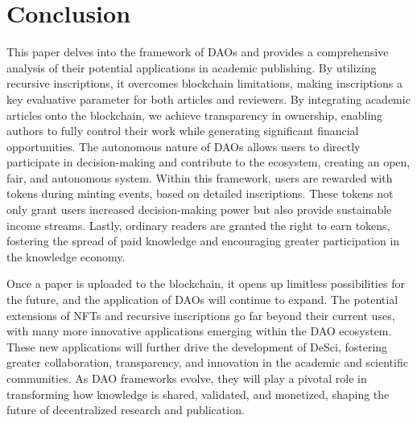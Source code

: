 \documentclass[lettersize,journal]{IEEEtran}
\begin{document}
\section{Conclusion \label{sec:conclusion}}
This paper delves into the framework of DAOs and provides a comprehensive analysis of their potential applications in academic publishing. By utilizing recursive inscriptions, it overcomes blockchain limitations, making inscriptions a key evaluative parameter for both articles and reviewers. By integrating academic articles onto the blockchain, we achieve transparency in ownership, enabling authors to fully control their work while generating significant financial opportunities. The autonomous nature of DAOs allows users to directly participate in decision-making and contribute to the ecosystem, creating an open, fair, and autonomous system. Within this framework, users are rewarded with tokens during minting events, based on detailed inscriptions. These tokens not only grant users increased decision-making power but also provide sustainable income streams. Lastly, ordinary readers are granted the right to earn tokens, fostering the spread of paid knowledge and encouraging greater participation in the knowledge economy.




Once a paper is uploaded to the blockchain, it opens up limitless possibilities for the future, and the application of DAOs will continue to expand. The potential extensions of NFTs and recursive inscriptions go far beyond their current uses, with many more innovative applications emerging within the DAO ecosystem. These new applications will further drive the development of DeSci, fostering greater collaboration, transparency, and innovation in the academic and scientific communities. As DAO frameworks evolve, they will play a pivotal role in transforming how knowledge is shared, validated, and monetized, shaping the future of decentralized research and publication.
\end{document}
